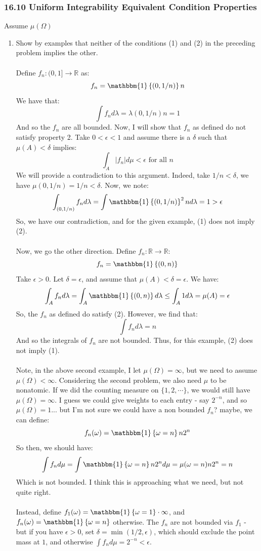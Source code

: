 \documentclass[12pt,a4paper]{article}
\newcommand{\1}[1]{\mathbbm{1}\left\{ #1 \right\}}
\newcommand{\R}{\mathbb{R}}
\begin{document}
\subsubsection{16.10 Uniform Integrability Equivalent Condition Properties} Assume $\mu(\Omega)$
\begin{enumerate}
	\item Show by examples that neither of the conditions (1) and (2) in the preceding problem implies the other.
	\\\\
	Define $f_n: (0,1] \to \R$ as:
	$$
		f_n = \1{(0,1/n)}n
	$$
	We have that:
	$$
		\int f_n d\lambda = \lambda(0,1/n)n = 1 
	$$
	And so the $f_n$ are all bounded. Now, I will show that $f_n$ as defined do not satisfy property 2. Take $0 < \epsilon < 1$ and assume there is a $\delta$ such that $\mu(A) < \delta$ implies:
	$$
		\int_A |f_n| d\mu < \epsilon \text{ for all $n$}
	$$
	We will provide a contradiction to this argument. Indeed, take $1/n < \delta$, we have $\mu(0,1/n) = 1/n < \delta$. Now, we note:
	$$
		\int_{(0,1/n)} f_n d\lambda = \int \1{(0,1/n)}^2n d\lambda = 1 > \epsilon
	$$
	So, we have our contradiction, and for the given example, (1) does not imply (2).
	\\\\
	Now, we go the other direction. Define $f_n: \R \to \R$:
	$$
		f_n = \1{(0,n)}
	$$
	Take $\epsilon > 0$. Let $\delta = \epsilon$, and assume that $\mu(A) < \delta = \epsilon$. We have:
	$$
		\int_A f_n d\lambda = \int_A \1{(0,n)} d\lambda \leq
		\int_A 1 d\lambda = \mu(A) = \epsilon
	$$
	So, the $f_n$ as defined do satisfy (2). However, we find that:
	$$
		\int f_n d\lambda = n
	$$
	And so the integrals of $f_n$ are not bounded. Thus, for this example, (2) does not imply (1).
	\\\\
	Note, in the above second example, I let $\mu(\Omega) = \infty$, but we need to assume $\mu(\Omega) < \infty$. Considering the second problem, we also need $\mu$ to be nonatomic. If we did the counting measure on $\{1, 2, \cdots\}$, we would still have $\mu(\Omega) = \infty$. I guess we could give weights to each entry - say $2^{-n}$, and so $\mu(\Omega) = 1$... but I'm not sure we could have a non bounded $f_n$? maybe, we can define:
	$$
		f_n(\omega) = \1{\omega = n} n2^n
	$$
	So then, we should have:
	$$
		\int f_n d\mu = \int \1{\omega = n} n2^n d\mu = \mu(\omega = n) n 2^n = n
	$$
	Which is not bounded. I think this is approaching what we need, but not quite right.
	\\\\
	Instead, define $f_1(\omega) = \1{\omega = 1} \cdot \infty$, and $f_n(\omega) = \1{\omega = n}$ otherwise. The $f_n$ are not bounded via $f_1$ - but if you have $\epsilon > 0$, set $\delta = \min(1/2, \epsilon)$, which should exclude the point mass at $1$, and otherwise $\int f_n d\mu = 2^{-n} < \epsilon$.
	

\end{enumerate}
\end{document}
